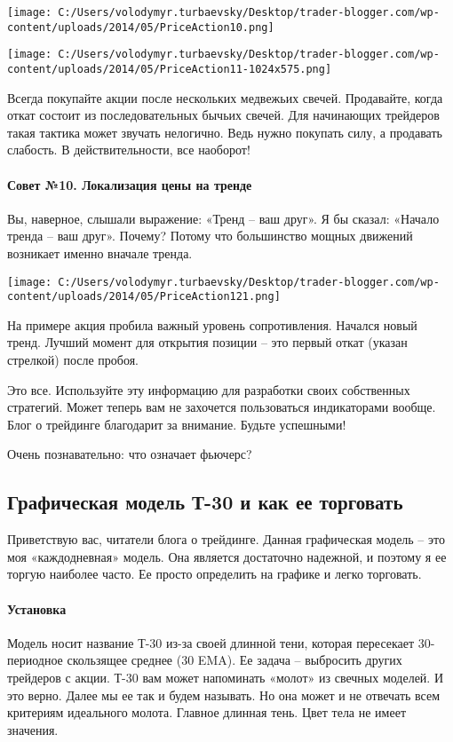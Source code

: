 \documentclass[a5paper]{article}
\begin{document}
\texttt{[image: C:/Users/volodymyr.turbaevsky/Desktop/trader-blogger.com/wp-content/uploads/2014/05/PriceAction10.png]}

\texttt{[image: C:/Users/volodymyr.turbaevsky/Desktop/trader-blogger.com/wp-content/uploads/2014/05/PriceAction11-1024x575.png]}

Всегда покупайте акции после нескольких медвежьих свечей. Продавайте,
когда откат состоит из последовательных бычьих свечей. Для начинающих
трейдеров такая тактика может звучать нелогично. Ведь нужно покупать
силу, а продавать слабость. В действительности, все наоборот!

\paragraph{Совет №10. Локализация цены на тренде}

Вы, наверное, слышали выражение: «Тренд – ваш друг». Я бы сказал: «Начало тренда – ваш друг». Почему? Потому что большинство мощных движений возникает именно вначале тренда.

\texttt{[image: C:/Users/volodymyr.turbaevsky/Desktop/trader-blogger.com/wp-content/uploads/2014/05/PriceAction121.png]}

На примере акция пробила важный уровень сопротивления. Начался новый тренд. Лучший момент для открытия позиции – это первый откат (указан стрелкой) после пробоя.

Это все. Используйте эту информацию для разработки своих собственных стратегий. Может теперь вам не захочется пользоваться индикаторами вообще. Блог о трейдинге благодарит за внимание. Будьте успешными!


Очень познавательно: что означает фьючерс?

\subsection{Графическая модель Т-30 и как ее торговать}

Приветствую вас, читатели блога о трейдинге. Данная графическая модель
– это моя «каждодневная» модель. Она является достаточно надежной, и
поэтому я ее торгую наиболее часто. Ее просто определить на графике и
легко торговать.

\paragraph{Установка}

Модель носит название Т-30 из-за своей длинной тени, которая пересекает 30-периодное скользящее среднее (30 EMA). Ее задача – выбросить других трейдеров с акции. Т-30 вам может напоминать «молот» из свечных моделей. И это верно. Далее мы ее так и будем называть. Но она может и не отвечать всем критериям идеального молота. Главное длинная тень. Цвет тела не имеет значения.
\end{document}
